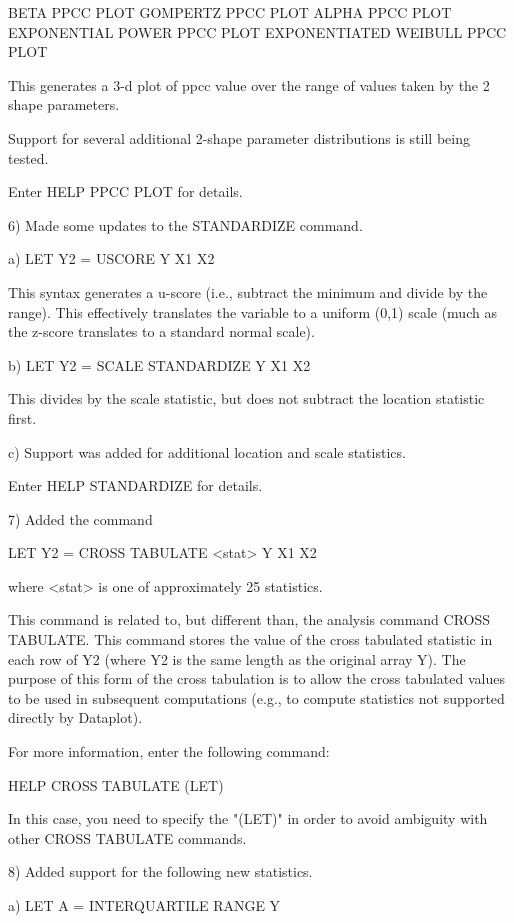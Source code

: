 {      BETA PPCC PLOT
      GOMPERTZ PPCC PLOT
      ALPHA PPCC PLOT
      EXPONENTIAL POWER PPCC PLOT
      EXPONENTIATED WEIBULL PPCC PLOT

    This generates a 3-d plot of ppcc value over the range of
    values taken by the 2 shape parameters.

    Support for several additional 2-shape parameter distributions
    is still being tested.

    Enter HELP PPCC PLOT for details.

 6) Made some updates to the STANDARDIZE command.

    a) LET Y2 = USCORE Y X1 X2

       This syntax generates a u-score (i.e., subtract the minimum
       and divide by the range).  This effectively translates
       the variable to a uniform (0,1) scale (much as the z-score
       translates to a standard normal scale).

    b) LET Y2 = SCALE STANDARDIZE Y X1 X2

       This divides by the scale statistic, but does not subtract
       the location statistic first.

    c) Support was added for additional location and scale
       statistics.

    Enter HELP STANDARDIZE for details.

 7) Added the command

      LET Y2 = CROSS TABULATE <stat> Y X1 X2

    where <stat> is one of approximately 25 statistics.

    This command is related to, but different than, the
    analysis command CROSS TABULATE.  This command stores
    the value of the cross tabulated statistic in
    each row of Y2 (where Y2 is the same length as the original
    array Y).  The purpose of this form of the cross tabulation
    is to allow the cross tabulated values to be used in
    subsequent computations (e.g., to compute statistics not
    supported directly by Dataplot).

    For more information, enter the following command:

        HELP CROSS TABULATE (LET)

    In this case, you need to specify the "(LET)" in order to
    avoid ambiguity with other CROSS TABULATE  commands.

 8) Added support for the following new statistics.

    a)  LET A = INTERQUARTILE RANGE Y

}
